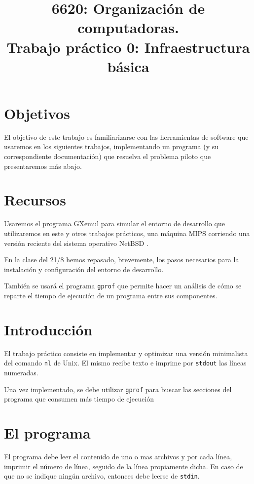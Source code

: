 \documentclass[9pt,a4paper]{article}
\title{6620: Organización de computadoras.\\ Trabajo práctico 0: Infraestructura básica}
\newcommand{\stdout}{\texttt{stdout}}
\newcommand{\stdin}{\texttt{stdin}}
\newcommand{\gprof}{\texttt{gprof}}
\newcommand{\nl}{\texttt{nl}}
\begin{document}
\maketitle
 \section{Objetivos}
El objetivo de este trabajo es familiarizarse con las herramientas de software que usaremos en los siguientes
trabajos, implementando un programa (y su correspondiente documentación) que 
resuelva el problema piloto que presentaremos más abajo.
 
 \section{Recursos}
 
Usaremos el programa GXemul \cite{GXEMUL} para simular el entorno de desarrollo
que utilizaremos en este y otros trabajos prácticos, una máquina MIPS corriendo
una versión reciente del sistema operativo NetBSD \cite{NETBSD}.

En la clase del 21/8 hemos repasado, brevemente, los pasos necesarios para la 
instalación y configuración del entorno de desarrollo.

También se usará el programa \gprof{} que permite hacer un análisis de cómo se reparte el tiempo de ejecución de un programa entre sus componentes.
\section{Introducción}
El trabajo práctico consiste en implementar y optimizar una versión minimalista
del comando \nl\cite{NL} de Unix. El mismo recibe texto e imprime por \stdout{} las 
líneas numeradas.

Una vez implementado, se debe utilizar \gprof\cite{GPROF} para buscar las secciones del programa que consumen
más tiempo de ejecución

\section{El programa}
El programa debe leer el contenido de uno o mas archivos y por cada línea, imprimir el número de línea, seguido de la línea propiamente dicha.
En caso de que no se indique ningún archivo, entonces debe leerse de \stdin.
\end{document}
